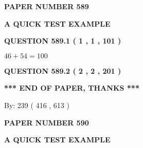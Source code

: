 \documentclass[12pt]{article}
\begin{document}
   
 {\textbf{ \Large{ PAPER NUMBER  589  }}}
   
   
\vspace{0.2in}
   
   
   
   
   
   
 \vspace{0.2in}
{\LARGE {\textbf{ A QUICK TEST EXAMPLE}}}
   
   
  
\vspace{0.2in}
  
{\textbf{\Large{QUESTION
589.1 
 ( 1 , 1 , 101 )
}}}
  
  
 
 

$ %
46 +  %
54=   %
100$
 
 
  
\vspace{0.2in}
  
{\textbf{\Large{QUESTION
589.2 
 ( 2 , 2 , 201 )
}}}
  
  
   
   
 \vspace{0.2in}
 
   
   
   
   
\vspace{1.0in} 
{\textbf{\large{ *** END OF PAPER, THANKS *** }}} 
   
   
\hspace{1.0in} By: 
 239 ( 416 ,  613 )
   
   
   
   
\newpage 
\setcounter{page}{ 
   590001 } 
   
   
   
   
 {\textbf{ \Large{ PAPER NUMBER  590  }}}
   
   
\vspace{0.2in}
   
   
   
   
   
   
 \vspace{0.2in}
{\LARGE {\textbf{ A QUICK TEST EXAMPLE}}}
   
   
  
\vspace{0.2in}
  
\end{document}
